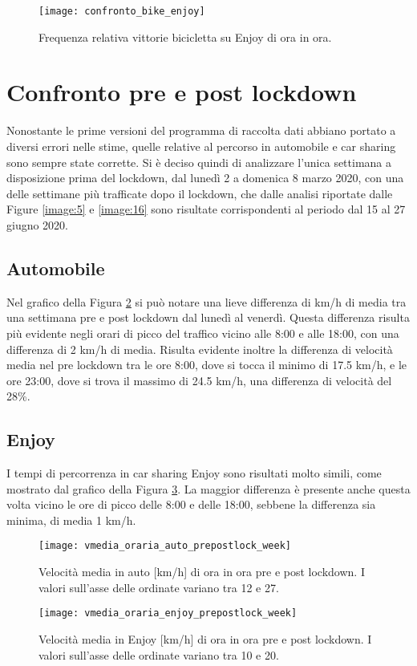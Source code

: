 \begin{figure}[H]
	\centering
	\texttt{[image: confronto\_bike\_enjoy]}
	\caption{Frequenza relativa vittorie bicicletta su Enjoy di ora in ora.}
	\label{image:14}
\end{figure}

\pagebreak

\section{Confronto pre e post lockdown}

Nonostante le prime versioni del programma di raccolta dati abbiano portato a diversi errori nelle stime, quelle relative al percorso in automobile e car sharing sono sempre state corrette. Si è deciso quindi di analizzare l'unica settimana a disposizione prima del lockdown, dal lunedì 2 a domenica 8 marzo 2020, con una delle settimane più trafficate dopo il lockdown, che dalle analisi riportate dalle Figure \ref{image:5} e \ref{image:16} sono risultate corrispondenti al periodo dal 15 al 27 giugno 2020.

\subsection{Automobile}

Nel grafico della Figura \ref{image:22} si può notare una lieve differenza di km/h di media tra una settimana pre e post lockdown dal lunedì al venerdì. Questa differenza risulta più evidente negli orari di picco del traffico vicino alle 8:00 e alle 18:00, con una differenza di 2 km/h di media. Risulta evidente inoltre la differenza di velocità media nel pre lockdown tra le ore 8:00, dove si tocca il minimo di 17.5 km/h, e le ore 23:00, dove si trova il massimo di 24.5 km/h, una differenza di velocità del 28\%.

\subsection{Enjoy}

I tempi di percorrenza in car sharing Enjoy sono risultati molto simili, come mostrato dal grafico della Figura \ref{image:24}. La maggior differenza è presente anche questa volta vicino le ore di picco delle 8:00 e delle 18:00, sebbene la differenza sia minima, di media 1 km/h.

\begin{figure}[H]
	\centering
	\texttt{[image: vmedia\_oraria\_auto\_prepostlock\_week]}
	\caption{Velocità media in auto [km/h] di ora in ora pre e post lockdown. I valori sull'asse delle ordinate variano tra 12 e 27.}
	\label{image:22}
\end{figure}

\begin{figure}[H]
	\centering
	\texttt{[image: vmedia\_oraria\_enjoy\_prepostlock\_week]}
	\caption{Velocità media in Enjoy [km/h] di ora in ora pre e post lockdown. I valori sull'asse delle ordinate variano tra 10 e 20.}
	\label{image:24}
\end{figure}












